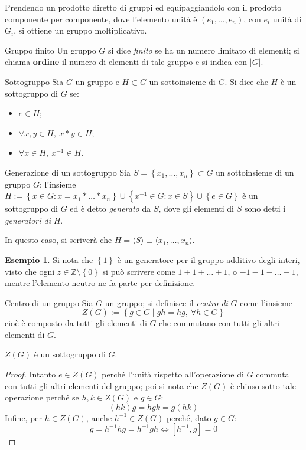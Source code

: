 \documentclass[11pt, a4paper]{scrartcl}
\theoremstyle{definition}
\newtheorem{esempio}{Esempio}
\numberwithin{esempio}{section}
\theoremstyle{definition}
\numberwithin{obs}{section}
\numberwithin{nota}{section}
\numberwithin{equation}{subsection}
\begin{document}
\noindent Prendendo un prodotto diretto di gruppi ed equipaggiandolo con il prodotto componente per componente, dove l'elemento unit\`a \`e $(e_1,\ldots,e_n)$, con $e_i$ unit\`a di $G_i$, si ottiene un gruppo moltiplicativo.
\begin{definizione}
	{Gruppo finito}{}
	Un gruppo $G$ si dice \textit{finito} se ha un numero limitato di elementi; si chiama \textbf{ordine} il numero di elementi di tale gruppo e si indica con $|G|$.
\end{definizione}
\begin{definizione}
	{Sottogruppo}{}
	Sia $G$ un gruppo e $H \subset G$ un sottoinsieme di $G$. Si dice che $H$ \`e un sottogruppo di $G$ se:
	\begin{itemize}
		\item  $e \in H$;
		\item $\forall x,y \in H, \ x*y \in H$;
		\item $\forall x \in H, \ x^{-1}  \in H$.
	\end{itemize}
\end{definizione}
\begin{definizione}
	{Generazione di un sottogruppo}{}
	Sia $S = \left\{ x_1,\ldots,x_n \right\} \subset  G$ un sottoinsieme di un gruppo $G$; l'insieme $H:= \left\{ x \in G : x = x_1 *\ldots*x_n  \right\}\cup \left\{ x^{-1} \in G : x \in S \right\} \cup \left\{ e \in G \right\}  $ \`e un sottogruppo di $G$ ed \`e detto \textit{generato} da $S$, dove gli elementi di $S$ sono detti i \textit{generatori di} $H$.

	In questo caso, si scriver\`a che $H = \langle S \rangle\equiv \langle x_1,\ldots,x_n \rangle$.
\end{definizione}
\begin{esempio}\label{1genz}
Si nota che $\left\{ 1 \right\} $ \`e un generatore per il gruppo additivo degli interi, visto che ogni $z \in \mathbb{Z} \setminus\left\{ 0 \right\} $ si pu\`o scrivere come $1 + 1+ \ldots +1$, o $-1 - 1-\ldots-1$, mentre l'elemento neutro ne fa parte per definizione.
\end{esempio}
\begin{definizione}
	{Centro di un gruppo}{}
	Sia $G$ un gruppo; si definisce il \textit{centro di} $G$ come l'insieme 
	\[
	Z(G) := \left\{ g \in G  \mid gh=hg, \ \forall h \in G \right\} 
	\] 
	cio\`e \`e composto da tutti gli elementi di $G$ che commutano con tutti gli altri elementi di $G$.
\end{definizione}
\begin{prop}
	{}{}
	$Z(G)$ \`e un sottogruppo di $G$.
	\begin{proof}
		Intanto $e \in Z(G)$ perch\'e l'unit\`a rispetto all'operazione di $G$ commuta con tutti gli altri elementi del gruppo; poi si nota che $Z(G)$ \`e chiuso sotto tale operazione perch\'e se $h,k \in Z(G)$ e $g\in G$:
		\[
			(hk)g=hgk=g(hk)
		\] 
		Infine, per $h \in Z(G)$, anche $h^{-1}  \in Z(G)$ perch\'e, dato $g \in G$:
		\[
			g = h^{-1}h g  = h^{-1} g h \iff [h^{-1} , g] = 0
		\] 
		
	\end{proof}
\end{prop}
\end{document}
